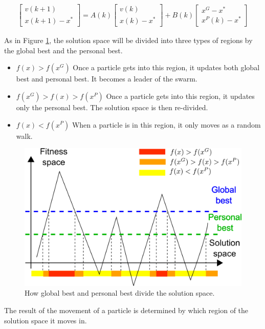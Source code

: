\begin{equation}
\label{eq:rel_opt}
\begin{aligned}
\begin{bmatrix}
v(k+1) \\
x(k+1) - x^{*}
\end{bmatrix}
 = A(k) 
\begin{bmatrix}
v(k) \\
 x(k) - x^{*}
\end{bmatrix}
+ B(k) 
\begin{bmatrix}
x^{G} - x^{*} \\
x^{P}(k) - x^{*}
\end{bmatrix}
\end{aligned}
\end{equation}


As in Figure \ref{fig:categorize_regions}, the solution space will be divided into three types of regions by the global best and the personal best.
\begin{itemize}
\item $ f(x) > f(x^G) $
Once a particle gets into this region, it updates both global best and personal best. 
It becomes a leader of the swarm.
\item $ f(x^{G}) > f(x) > f(x^{P}) $
Once a particle gets into this region, it updates only the personal best.
The solution space is then re-divided.
\item $ f(x) < f(x^{P}) $
When a particle is in this region, it only moves as a random walk.
\end{itemize}

\begin{figure}
\centering
\includegraphics[width=0.7\linewidth]{./fig/categorize_regions}
\caption{How global best and personal best divide the solution space.}
\label{fig:categorize_regions}
\end{figure}

The result of the movement of a particle is determined by which region of the solution space it moves in.


